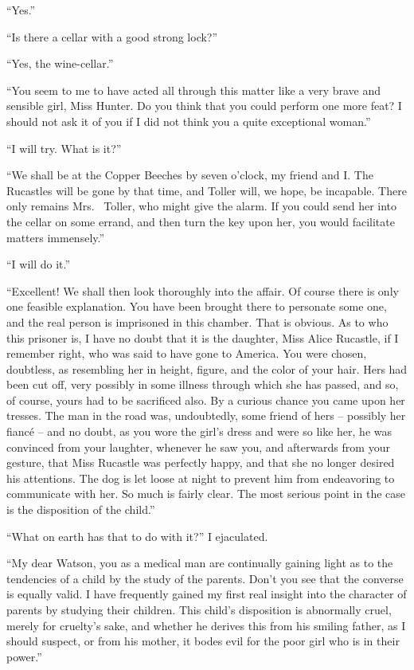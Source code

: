“Yes.”

“Is there a cellar with a good strong lock?”

“Yes, the wine-cellar.”

“You seem to me to have acted all through this matter like
a very brave and sensible girl, Miss Hunter. Do you think
that you could perform one more feat? I should not ask it of
you if I did not think you a quite exceptional woman.”

“I will try. What is it?”

“We shall be at the Copper Beeches by seven o’clock, my
friend and I. The Rucastles will be gone by that time, and
Toller will, we hope, be incapable. There only remains Mrs.\ %
Toller, who might give the alarm. If you could send her into
the cellar on some errand, and then turn the key upon her,
you would facilitate matters immensely.”

“I will do it.”

“Excellent! We shall then look thoroughly into the affair.
Of course there is only one feasible explanation. You have
been brought there to personate some one, and the real person
is imprisoned in this chamber. That is obvious. As to who
this prisoner is, I have no doubt that it is the daughter, Miss
Alice Rucastle, if I remember right, who was said to have
gone to America. You were chosen, doubtless, as resembling
her in height, figure, and the color of your hair. Hers had
been cut off, very possibly in some illness through which she
has passed, and so, of course, yours had to be sacrificed also.
By a curious chance you came upon her tresses. The man in
the road was, undoubtedly, some friend of hers -- possibly her
fiancé -- and no doubt, as you wore the girl’s dress and were so
like her, he was convinced from your laughter, whenever he
saw you, and afterwards from your gesture, that Miss Rucastle
was perfectly happy, and that she no longer desired his attentions.
The dog is let loose at night to prevent him from
endeavoring to communicate with her. So much is fairly
clear. The most serious point in the case is the disposition
of the child.”

“What on earth has that to do with it?” I ejaculated.

“My dear Watson, you as a medical man are continually
gaining light as to the tendencies of a child by the study of the
parents. Don’t you see that the converse is equally valid. I
have frequently gained my first real insight into the character
of parents by studying their children. This child’s disposition
is abnormally cruel, merely for cruelty’s sake, and whether he
derives this from his smiling father, as I should suspect, or from
his mother, it bodes evil for the poor girl who is in their power.”

